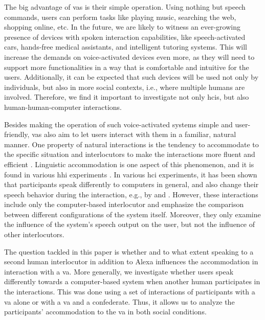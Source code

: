 The big advantage of \acp{va} is their simple operation.
Using nothing but speech commands, users can perform tasks like playing music, searching the web, shopping online, etc.
In the future, we are likely to witness an ever-growing presence of devices with spoken interaction capabilities, like speech-activated cars, hands-free medical assistants, and intelligent tutoring systems.
This will increase the demands on voice-activated devices even more, as they will need to support more functionalities in a way that is comfortable and intuitive for the users.
Additionally, it can be expected that such devices will be used not only by individuals, but also in more social contexts, i.e., where multiple humans are involved.
Therefore, we find it important to investigate not only \aclp{hci}, but also human-human-computer interactions.

Besides making the operation of such voice-activated systems simple and user-friendly, \acp{va} also aim to let users interact with them in a familiar, natural manner.
One property of natural interactions is the tendency to accommodate to the specific situation and interlocutors to  make the interactions more fluent and efficient \citep{Giles1991CAT,Gallois2015CAT}.
Linguistic accommodation is one aspect of this phenomenon, and it is found in various \ac{hhi} experiments \citep[e.g.,][]{Pardo2017phonetic,Schweitzer2017social}.
In various \ac{hci} experiments, it has been shown that participants speak differently to computers in general, and also change their speech behavior during the interaction, e.g., by \citet{Branigan2010linguistic} and \citet{Levitan2016implementing}.
However, these interactions include only the computer-based interlocutor and emphasize the comparison between different configurations of the system itself.
Moreover, they only examine the influence of the system's speech output on the user, but not the influence of other interlocutors.

The question tackled in this paper is whether and to what extent speaking to a second human interlocutor in addition to Alexa influences the accommodation in interaction with a \ac{va}.
More generally, we investigate whether users speak differently towards a computer-based system when another human participates in the interactions.
This was done using a set of interactions of participants with a \ac{va} alone or with a \ac{va} and a confederate.
Thus, it allows us to analyze the participants' accommodation to the \ac{va} in both social conditions.

